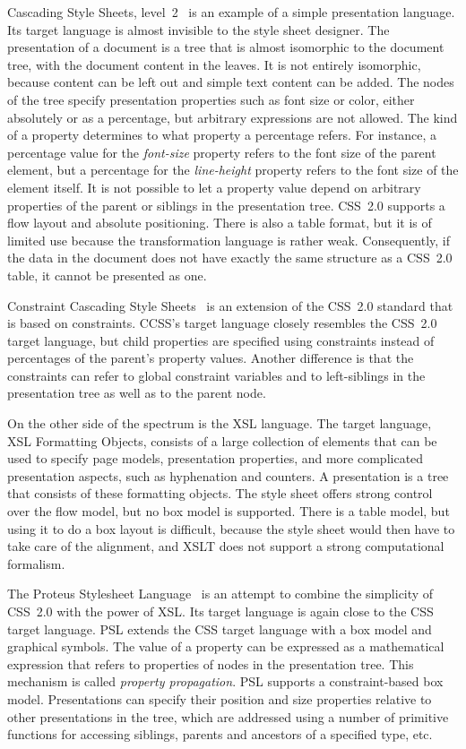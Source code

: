  Cascading Style Sheets, level~2~\cite{css} is an example of a simple presentation language. Its target language is almost invisible to the style sheet designer. The presentation of a document is a tree that is almost isomorphic to the document tree, with the document content in the leaves. It is not entirely isomorphic, because content can be left out and simple text content can be added. The nodes of the tree specify presentation properties such as font size or color, either absolutely or as a percentage, but arbitrary expressions are not allowed. The kind of a property determines to what property a percentage refers. For instance, a percentage value for the {\em font-size} property refers to the font size of the parent element, but a percentage for the {\em line-height} property refers to the font size of the element itself. It is not possible to let a property value depend on arbitrary properties of the parent or siblings in the presentation tree. CSS~2.0 supports a flow layout and absolute positioning. There is also a table format, but it is of limited use because the transformation language is rather weak. Consequently, if the data in the document does not have exactly the same structure as a CSS~2.0 table, it cannot be presented as one.

 Constraint Cascading Style Sheets~\cite{badros99ccss} is an extension of the CSS~2.0 standard that is based on constraints. CCSS's target language closely resembles the CSS~2.0 target language, but child properties are specified using constraints instead of percentages of the parent's property values. Another difference is that the constraints can refer to global constraint variables and to left-siblings in the presentation tree as well as to the parent node. 

 On the other side of the spectrum is the XSL language. The target language, XSL Formatting Objects, consists of a large collection of elements that can be used to specify page models, presentation properties, and more complicated presentation aspects, such as hyphenation and counters. A presentation is a tree that consists of these formatting objects. The style sheet offers strong control over the flow model, but no box model is supported. There is a table model, but using it to do a box layout is difficult, because the style sheet would then have to take care of the alignment, and XSLT does not support a strong computational formalism.

 The Proteus Stylesheet Language~\cite{marden98psl} is an attempt to combine the simplicity of CSS~2.0 with the power of XSL. Its target language is again close to the CSS target language. PSL extends the CSS target language with a box model and graphical symbols. The value of a property can be expressed as a mathematical expression that refers to properties of nodes in the presentation tree. This mechanism is called {\em property propagation}. PSL supports a constraint-based box model. Presentations can specify their position and size properties relative to other presentations in the tree, which are addressed using a number of primitive functions for accessing siblings, parents and ancestors of a specified type, etc.

